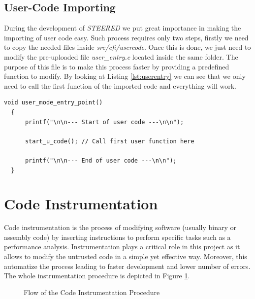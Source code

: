 \subsection{User-Code Importing}
\label{subsec:project_ucodeimport}

During the development of \textit{STEERED} we put great importance in making the
importing of user code easy. Such process requires only two steps, firstly we
need to copy the needed files inside \textit{src/cfi/usercode}. Once this is
done, we just need to modify the pre-uploaded file \textit{user\_entry.c}
located inside the same folder. The purpose of this file is to make this process
faster by providing a predefined function to modify. By looking at Listing
\ref{lst:userentry} we can see that we only need to call the first function of
the imported code and everything will work.

\begin{lstlisting}[style=CStyle, caption = User Entry File, label={lst:userentry}]
  void user_mode_entry_point()
  {
      printf("\n\n--- Start of user code ---\n\n");

      start_u_code(); // Call first user function here

      printf("\n\n--- End of user code ---\n\n");
  }
\end{lstlisting}

\section{Code Instrumentation}
\label{sec:project_instrumentation}

Code instrumentation is the process of modifying software (usually binary or assembly
code) by inserting instructions to perform specific tasks such as a performance
analysis. Instrumentation plays a critical role in this project as it allows to modify
the untrusted code in a simple yet effective way. Moreover, this automatize the process
leading to faster development and lower number of errors. The whole
instrumentation procedure is depicted in Figure \ref{fig:instrumentation}.

\begin{figure}[htbp]
  \centering
  \def\stackalignment{r} %
  {\scriptsize }
  \caption{Flow of the Code Instrumentation Procedure}
  \label{fig:instrumentation}
\end{figure}

